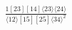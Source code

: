 \documentclass[varwidth, border=5pt]{standalone}
\begin{document}
\begin{my}
$\begin{gathered}
\scriptscriptstyle\frac{1[23][14]⟨23⟩⟨24⟩}{⟨12⟩[15][25]⟨34⟩^2}
\end{gathered}$
\end{my}
\end{document}
